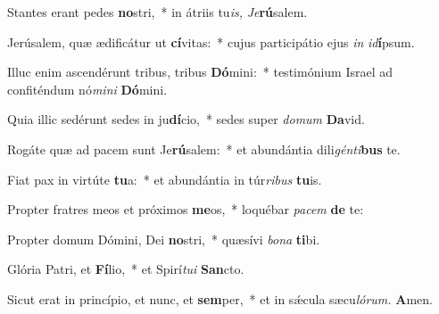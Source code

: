 \item Stantes erant pedes \textbf{no}stri,~* in átriis tu\textit{is,} \textit{Je}\textbf{rú}salem.
\item Jerúsalem, quæ ædificátur ut \textbf{cí}vitas:~* cujus participátio ejus \textit{in} \textit{id}\textbf{í}psum.
\item Illuc enim ascendérunt tribus, tribus \textbf{Dó}mini:~* testimónium Israel ad confiténdum nó\textit{mini} \textbf{Dó}mini.
\item Quia illic sedérunt sedes in ju\textbf{dí}cio,~* sedes super \textit{domum} \textbf{Da}vid.
\item Rogáte quæ ad pacem sunt Je\textbf{rú}salem:~* et abundántia dili\textit{génti}\textbf{bus} te.
\item Fiat pax in virtúte \textbf{tu}a:~* et abundántia in túr\textit{ribus} \textbf{tu}is.
\item Propter fratres meos et próximos \textbf{me}os,~* loquébar \textit{pacem} \textbf{de} te:
\item Propter domum Dómini, Dei \textbf{no}stri,~* quæsívi \textit{bona} \textbf{ti}bi.
\item Glória Patri, et \textbf{Fí}lio,~* et Spirí\tinyhspace\textit{tui} \textbf{San}cto.
\item Sicut erat in princípio, et nunc, et \textbf{sem}per,~* et in sǽcula sæcu\tinyhspace\textit{lórum.} \textbf{A}men.
